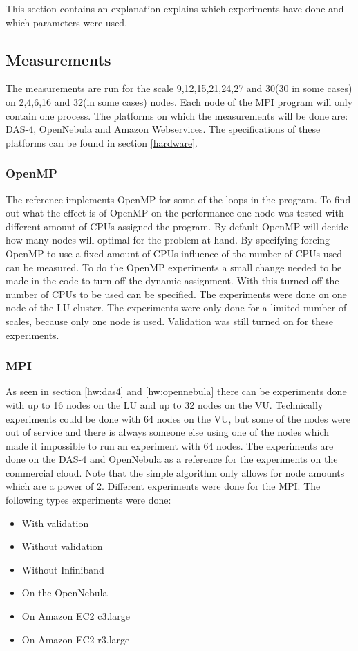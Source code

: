 This section contains an explanation explains which experiments have done and which parameters were used.


\subsection{Measurements}
The measurements are run for the scale 9,12,15,21,24,27 and 30(30 in some cases) on 2,4,6,16 and 32(in some cases) nodes. Each node of the MPI program will only contain one process. The platforms on which the measurements will be done are: DAS-4, OpenNebula and Amazon Webservices. The specifications of these platforms can be found in section \ref{hardware}.

\subsubsection{OpenMP}
The reference implements OpenMP for some of the loops in the program. To find out what the effect is of OpenMP on the performance one node was tested with different amount of CPUs assigned the program. By default OpenMP will decide how many nodes will optimal for the problem at hand. By specifying forcing OpenMP to use a fixed amount of CPUs influence of the number of CPUs used can be measured. To do the OpenMP experiments a small change needed to be made in the code to turn off the dynamic assignment. With this turned off the number of CPUs to be used can be specified. The experiments were done on one node of the LU cluster. The experiments were only done for a limited number of scales, because only one node is used. Validation was still turned on for these experiments.

\subsubsection{MPI}
As seen in section \ref{hw:das4} and \ref{hw:opennebula} there can be experiments done with up to 16 nodes on the LU and up to 32 nodes on the VU. Technically experiments could be done with 64 nodes on the VU, but some of the nodes were out of service and there is always someone else using one of the nodes which made it impossible to run an experiment with 64 nodes.
The experiments are done on the DAS-4 and OpenNebula as a reference for the experiments on the commercial cloud. 
Note that the simple algorithm only allows for node amounts which are a power of 2. Different experiments were done for the MPI. The following types experiments were done:
\begin{itemize}
	\item With validation
	\item Without validation
	\item Without Infiniband
	\item On the OpenNebula
	\item On Amazon EC2 c3.large 
	\item On Amazon EC2 r3.large 
\end{itemize}

